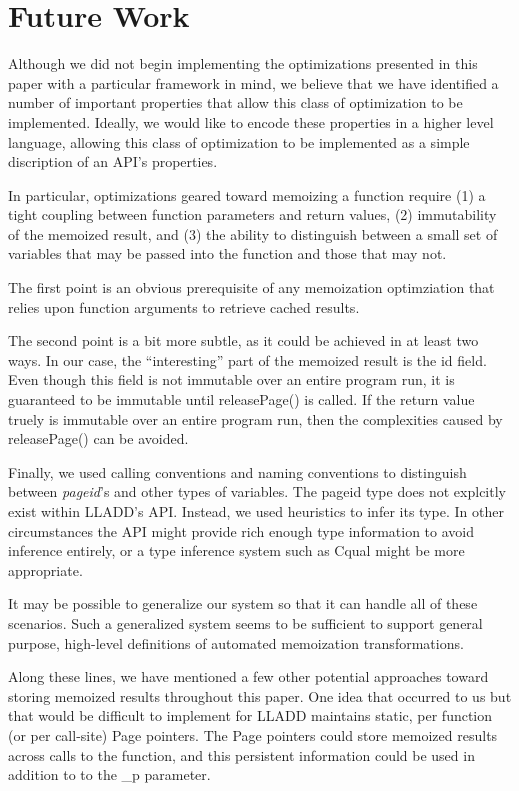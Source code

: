 \documentclass[10pt,letterpaper,twocolumn,english]{article}
\newcommand{\yad}{LLADD\xspace}
\newcommand{\unpin}{releasePage()\xspace}
\newcommand{\PP}{\_p\xspace}
\begin{document}
\section{Future Work}
Although we did not begin implementing the optimizations presented in
this paper with a particular framework in mind, we believe that we
have identified a number of important properties that allow this class
of optimization to be implemented.  Ideally, we would like to encode
these properties in a higher level language, allowing this class of 
optimization to be implemented as a simple discription of an API's properties.

In particular, optimizations geared toward memoizing a function require
(1) a tight coupling between function parameters and return values,
(2) immutability of the memoized result, and (3) the ability to distinguish
between a small set of variables that may be passed into the function
and those that may not.

The first point is an obvious prerequisite of any memoization
optimziation that relies upon function arguments to retrieve cached
results.  

The second point is a bit more subtle, as it could be
achieved in at least two ways.  In our case, the ``interesting'' part of the
memoized result is the id field.  Even
though this field is not immutable over an entire program run, it is
guaranteed to be immutable until \unpin is called.  If the return
value truely is immutable over an entire program run, then the
complexities caused by \unpin can be avoided.

Finally, we used calling conventions and naming conventions to
distinguish between {\em pageid}'s and other types of variables.  The
pageid type does not explcitly exist within \yad's API.  Instead, we
used heuristics to infer its type.  In other circumstances the API
might provide rich enough type information to avoid inference
entirely, or a type inference system such as Cqual might be more
appropriate.

It may be possible to generalize our system so that it can handle all
of these scenarios.  Such a generalized system seems to be sufficient
to support general purpose, high-level definitions of automated
memoization transformations.

Along these lines, we have mentioned a few other potential approaches
toward storing memoized results throughout this paper.  One idea that
occurred to us but that would be difficult to implement for \yad
maintains static, per function (or per call-site) Page pointers.  The
Page pointers could store memoized results across calls to the
function, and this persistent information could be used in addition to to
the \PP parameter.
\end{document}
